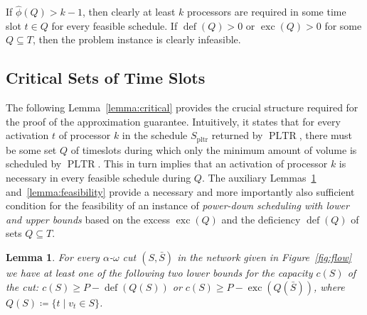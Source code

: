 \documentclass[a4paper]{article}
\DeclareMathOperator{\pltr}{pltr}
\DeclareMathOperator{\PLTR}{PLTR}
\DeclareMathOperator{\opdef}{def}
\DeclareMathOperator{\exc}{exc}
\newtheorem{lemma}[theorem]{Lemma}
\begin{document}
If $\hat \phi(Q) > k - 1$, then clearly at least $k$ processors are required in some time slot $t \in Q$ for every feasible schedule.
If $\opdef(Q) > 0$ or $\exc(Q) > 0$ for some $Q \subseteq T$, then the problem instance is clearly infeasible.


\subsection{Critical Sets of Time Slots}
The following Lemma~\ref{lemma:critical} provides the crucial structure required for the proof of the approximation guarantee.
Intuitively, it states that for every activation $t$ of processor $k$ in the schedule $S_{\pltr}$ returned by $\PLTR$, there must be some set $Q$ of timeslots during which only the minimum amount of volume is scheduled by $\PLTR$.
This in turn implies that an activation of processor $k$ is necessary in every feasible schedule during $Q$.
The auxiliary Lemmas~\ref{lemma:cut} and~\ref{lemma:feasibility} provide a necessary and more importantly also sufficient condition for the feasibility of an instance of \emph{power-down scheduling with lower and upper bounds} based on the excess $\exc(Q)$ and the deficiency $\opdef(Q)$ of sets $Q \subseteq T$.
\begin{lemma}\label{lemma:cut}
  For every $\alpha$-$\omega$ cut $(S, \bar S)$ in the network given in Figure~\ref{fig:flow} we have at least one of the following two lower bounds for the capacity $c(S)$ of the cut:
  $c(S) \geq P - \opdef(Q(S))$ or $c(S) \geq P - \exc(Q(\bar S))$, where $Q(S) \coloneqq \{ t \mid v_t \in S \}$.
\end{lemma}
\end{document}
